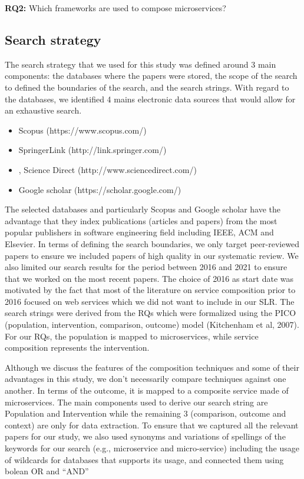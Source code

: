\documentclass{article}
\begin{document}
\begin{multicols}{2}
\textbf{RQ2:} Which frameworks are used to compose microservices?


\subsection{Search strategy}

The search strategy that we used for this study was defined around 3 main components: the databases where the papers were stored, the scope of the search to defined the boundaries of the search, and the search strings.
With regard to the databases, we identified 4 mains electronic data sources that would allow for an exhaustive search.

\begin{itemize}
\item Scopus (https://www.scopus.com/)
\item SpringerLink (http://link.springer.com/)
\item, Science Direct (http://www.sciencedirect.com/)
\item Google scholar (https://scholar.google.com/)
\end{itemize}

The selected databases and particularly Scopus and Google scholar have the advantage that they index publications (articles and papers) from the most popular publishers in software engineering field including IEEE, ACM and Elsevier.
In terms of defining the search boundaries, we only target peer-reviewed papers to ensure we included papers of high quality in our systematic review. We also limited our search results for the period between 2016 and 2021 to ensure that we worked on the most recent papers. The choice of 2016 as start date was motivated by the fact that most of the literature on service composition prior to 2016 focused on web services which we did not want to include in our SLR.
The search strings were derived from the RQs which were formalized using the PICO (population, intervention, comparison, outcome) model (Kitchenham et al, 2007). For our RQs, the population is mapped to microservices, while service composition represents the intervention.

Although we discuss the features of the composition techniques and some of their advantages in this study, we don’t necessarily compare techniques against one another. In terms of the outcome, it is mapped to a composite service made of microservices. The main components used to derive our search string are Population and Intervention while the remaining 3 (comparison, outcome and context) are only for data extraction. To ensure that we captured all the relevant papers for our study, we also used synonyms and variations of spellings of the keywords for our search (e.g., microservice and micro-service) including the usage of wildcards for databases that supports its usage, and connected them using bolean OR and “AND”


\end{multicols}
\end{document}
